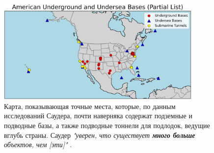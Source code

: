 \documentclass[10pt,twocolumn,letterpaper]{article}
\begin{document}
\begin{figure}[t]
\begin{center}
\includegraphics[width=0.9\textwidth]{basescrop.png}
\end{center}
   \caption{Карта, показывающая точные места, которые, по данным исследований Саудера, почти наверняка содержат подземные и подводные базы, а также подводные тоннели для подлодок, ведущие вглубь страны. Саудер \textit{"уверен, что существует \textbf{много больше} объектов, чем [эти]"} \cite{22}.}
   \label{fig:4}
\end{figure}
\end{document}

